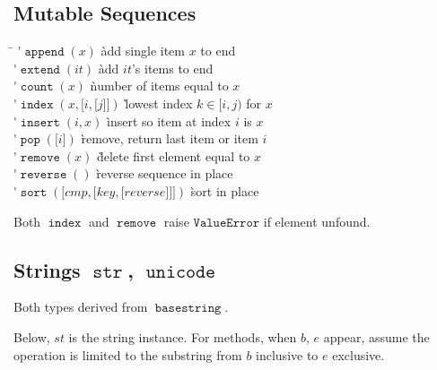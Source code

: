 \documentclass[landscape,10pt,letterpaper]{article}
\newcommand{\subheading}[1]{\vspace{-1.2em} \subsection*{#1} \vspace{-0.8em}}
\newcommand{\pyf}[1]{\ensuremath{\mathop{\mathtt{#1}}}}
\newcommand{\pys}[1]{\ensuremath{\mathtt{#1}}}
\newcommand{\pyt}[1]{\pyf{#1}}
\newcommand{\optional}[1]{{[}{#1}{]}}
\begin{document}
\begin{multicols}{6}
\subheading{Mutable Sequences}

\begin{tabbing}
\hspace{2em}\= \kill
\'$\pyf{append}(x)$ \` add single item $x$ to end \\
\'$\pyf{extend}(it)$ \` add $it$'s items to end \\
\'$\pyf{count}(x)$ \` number of items equal to $x$ \\
\'$\pyf{index}(x,\!\optional{i,\!\optional{j}})$ \` lowest index $k\!\in\![i,j)$ for $x$ \\
\'$\pyf{insert}(i, x)$ \` insert so item at index $i$ is $x$ \\
\'$\pyf{pop}(\optional{i})$ \` remove, return last item or item $i$ \\
\'$\pyf{remove}(x)$ \` delete first element equal to $x$ \\
\'$\pyf{reverse}()$ \` reverse sequence in place \\
\'$\pyf{sort}(\optional{cmp, \optional{key, \optional{reverse}}})$ \` sort in place
\end{tabbing} \vspace{-1em}
Both \pyf{index} and \pyf{remove} raise \pys{ValueError} if element unfound.

\subheading{Strings \pyt{str}, \pyt{unicode}}

Both types derived from \pyt{basestring}.

Below, $st$ is the string instance.  For methods, when $b$, $e$ appear, assume the operation is limited to the substring from $b$ inclusive to $e$ exclusive.


\end{multicols}
\end{document}
